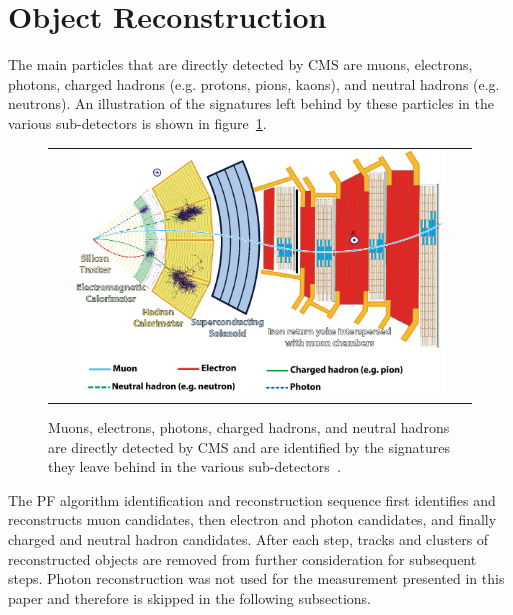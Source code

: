 \section{Object Reconstruction}
The main particles that are directly detected by CMS are muons, electrons, photons, charged hadrons (e.g. protons, pions, kaons), and neutral hadrons (e.g. neutrons).
An illustration of the signatures left behind by these particles in the various sub-detectors is shown in figure~\ref{CMS_Layers}.
\begin{figure}[htb]
  \begin{center}
    \begin{tabular}{c}
        \includegraphics[width=0.9\textwidth]{fig_LHC_CMS/CMS_Layers.png}
    \end{tabular}
    \caption{Muons, electrons, photons, charged hadrons, and neutral hadrons are directly detected by CMS and are identified by the signatures they leave behind in the various sub-detectors~\cite{Sirunyan:2270046}.
            }
    \label{CMS_Layers}
  \end{center}
\end{figure}
The PF algorithm identification and reconstruction sequence first identifies and reconstructs muon candidates, then electron and photon candidates, and finally charged and neutral hadron candidates.
After each step, tracks and clusters of reconstructed objects are removed from further consideration for subsequent steps.
Photon reconstruction was not used for the measurement presented in this paper and therefore is skipped in the following subsections.

